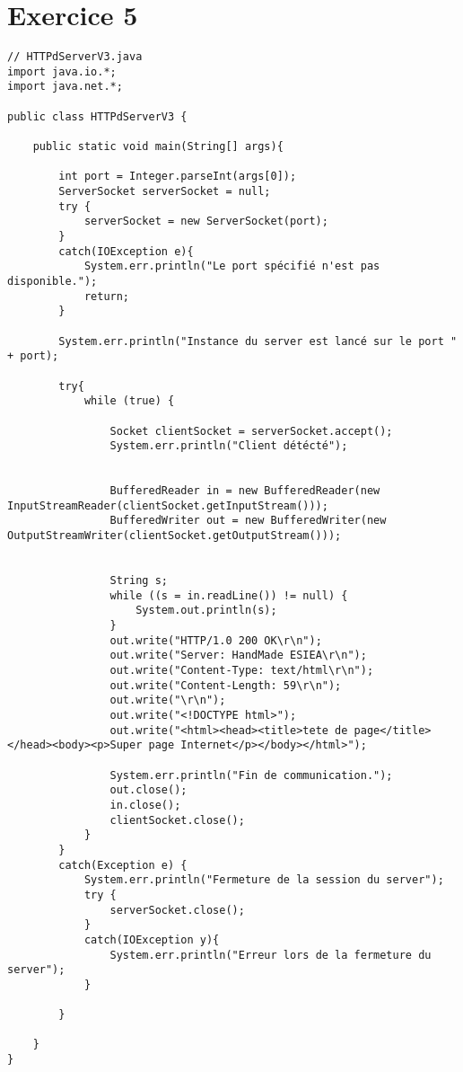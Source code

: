 \documentclass{article}
\begin{document}
\section*{Exercice 5}
\begin{lstlisting}
// HTTPdServerV3.java
import java.io.*;
import java.net.*;

public class HTTPdServerV3 {

    public static void main(String[] args){

        int port = Integer.parseInt(args[0]);
        ServerSocket serverSocket = null;
        try {
            serverSocket = new ServerSocket(port);
        }
        catch(IOException e){
            System.err.println("Le port spécifié n'est pas disponible.");
            return;
        }
        
        System.err.println("Instance du server est lancé sur le port " + port);
    
        try{
            while (true) {
                
                Socket clientSocket = serverSocket.accept();
                System.err.println("Client détécté");
        
        
                BufferedReader in = new BufferedReader(new InputStreamReader(clientSocket.getInputStream()));
                BufferedWriter out = new BufferedWriter(new OutputStreamWriter(clientSocket.getOutputStream()));
                
                
                String s;
                while ((s = in.readLine()) != null) {
                    System.out.println(s);
                }
                out.write("HTTP/1.0 200 OK\r\n");
                out.write("Server: HandMade ESIEA\r\n");
                out.write("Content-Type: text/html\r\n");
                out.write("Content-Length: 59\r\n");
                out.write("\r\n");
                out.write("<!DOCTYPE html>");
                out.write("<html><head><title>tete de page</title></head><body><p>Super page Internet</p></body></html>");
                
                System.err.println("Fin de communication.");
                out.close();
                in.close();
                clientSocket.close();
            }
        }
        catch(Exception e) {
            System.err.println("Fermeture de la session du server");
            try {
                serverSocket.close();
            }
            catch(IOException y){
                System.err.println("Erreur lors de la fermeture du server");
            }
            
        }
        
    }
}
\end{lstlisting}
\end{document}
